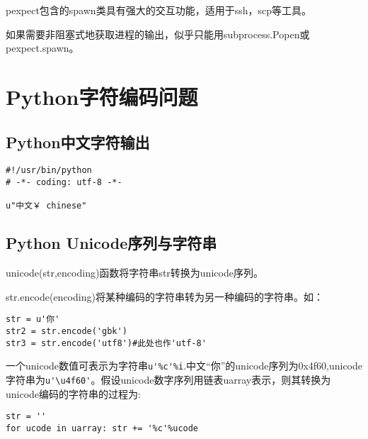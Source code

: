 pexpect包含的spawn类具有强大的交互功能，适用于ssh，scp等工具。

如果需要非阻塞式地获取进程的输出，似乎只能用subprocess.Popen或pexpect.spawn。


\section{Python字符编码问题}
\subsection{Python中文字符输出}
\begin{verbatim}
#!/usr/bin/python
# -*- coding: utf-8 -*-

u"中文￥ chinese"
\end{verbatim}

\subsection{Python Unicode序列与字符串}
unicode(str,encoding)函数将字符串str转换为unicode序列。

str.encode(encoding)将某种编码的字符串转为另一种编码的字符串。如：
\begin{verbatim}
str = u'你'
str2 = str.encode('gbk')
str3 = str.encode('utf8')#此处也作'utf-8'
\end{verbatim}


一个unicode数值可表示为字符串\verb|u'%c'%i|.中文“你”的unicode序列为0x4f60,unicode字符串为\verb|u'\u4f60'|。假设unicode数字序列用链表uarray表示，则其转换为unicode编码的字符串的过程为:
\begin{verbatim}
str = ''
for ucode in uarray: str += '%c'%ucode
\end{verbatim}

\label{subsec:PythonUnicode}




